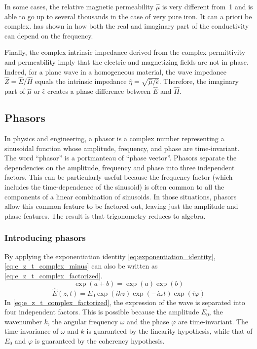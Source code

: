 In some cases, the relative magnetic permeability $\hat{\mu}$ is very different from~1 and is able to go up to several thousands in the case of very pure iron.
It can a priori be complex.
\citeauthor{bowler2006frequency} has shown in  \cite{bowler2006frequency} how both the real and imaginary part of the conductivity can depend on the frequency.


Finally, the complex intrinsic impedance derived from the complex permittivity and permeability imply that the electric and magnetizing fields are not in phase.
Indeed, for a plane wave in a homogeneous material, the wave impedance $\hat{Z}=\hat{E}/\hat{H}$ equals the intrinsic impedance $\hat{\eta}=\sqrt{\hat{\mu}/\hat{\epsilon}}$.
Therefore, the imaginary part of $\hat{\mu}$ or $\hat{\epsilon}$ creates a phase difference between $\hat{E}$ and $\hat{H}$.


\subsection{Phasors}
\label{sec:phasors}
In physics and engineering, a phasor is a complex number representing a sinusoidal function whose amplitude, frequency, and phase are time-invariant.
The word ``phasor'' is a portmanteau of ``phase vector''.
Phasors separate the dependencies on the amplitude, frequency and phase into three independent factors.
This can be particularly useful because the frequency factor (which includes the time-dependence of the sinusoid) is often common to all the components of a linear combination of sinusoids.
In those situations, phasors allow this common feature to be factored out, leaving just the amplitude and phase features.
The result is that trigonometry reduces to algebra.



\subsubsection{Introducing phasors}
By applying the exponentiation identity \eqref{eq:exponentiation_identity},
\cref{eq:e_z_t_complex_minus} can also be written as \cref{eq:e_z_t_complex_factorized}.
\begin{equation}
    \exp(a+b) = \exp(a) \exp(b)
    \label{eq:exponentiation_identity}
\end{equation}
\begin{equation}
    \hat{E}(z, t)
    =
    E_0 \exp(ikz) \exp(-i\omega t) \exp({i \varphi})
    \label{eq:e_z_t_complex_factorized}
\end{equation}
In \cref{eq:e_z_t_complex_factorized}, the expression of the wave is separated into four independent factors.
This is possible because the amplitude $E_0$, the wavenumber $k$, the angular frequency $\omega$ and the phase $\varphi$ are time-invariant.
The time-invariance of $\omega$ and $k$ is guaranteed by the linearity hypothesis, while that of $E_0$ and $\varphi$ is guaranteed by the coherency hypothesis.

